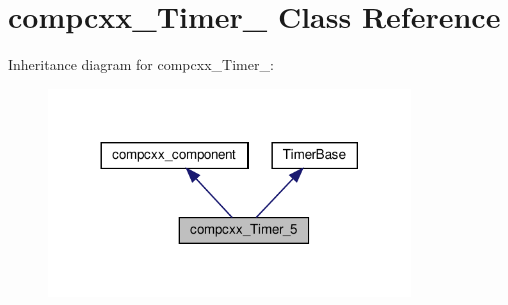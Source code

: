 \hypertarget{classcompcxx__Timer__5}{}\section{compcxx\+\_\+\+Timer\+\_ Class Reference}
\label{classcompcxx__Timer__5}


Inheritance diagram for compcxx\+\_\+\+Timer\+\_\+:\nopagebreak
\begin{figure}[H]
\begin{center}
\leavevmode
\includegraphics[width=272pt]{classcompcxx__Timer__5__inherit__graph}
\end{center}
\end{figure}


